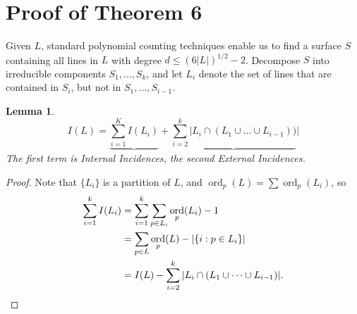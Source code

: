 \documentclass{article}
\theoremstyle{plain}
\newtheorem{lemma}[theorem]{Lemma}
\newtheorem*{example}{Example}
\DeclareMathOperator{\RR}{\mathbf{R}}
\DeclareMathOperator{\ord}{\text{ord}}
\begin{document}


\section{Proof of Theorem 6}

Given $L$, standard polynomial counting techniques enable us to find a surface $S$ containing all lines in $L$ with degree $d \leq (6|L|)^{1/2} - 2$. Decompose $S$ into irreducible components $S_1, \dots, S_k$, and let $L_i$ denote the set of lines that are contained in $S_i$, but not in $S_1, \dots, S_{i-1}$.

\begin{lemma}
    \[ I(L) = \underbrace{\sum_{i = 1}^K I(L_i)} + \underbrace{\sum_{i = 2}^k |L_i \cap (L_1 \cup \dots \cup L_{i-1}))}| \]
    The first term is {\it Internal Incidences}, the second {\it External Incidences}.
\end{lemma}
\begin{proof}
    Note that $\{ L_i \}$ is a partition of $L$, and $\ord_p(L) = \sum \ord_p(L_i)$, so
    \begin{align*}
        \sum_{i = 1}^k I(L_i) &= \sum_{i = 1}^k \sum_{p \in L_i} \ord_p(L_i) - 1\\
        &= \sum_{p \in L} \ord_p(L) - |\{ i: p \in L_i \}|\\
        &= I(L) - \sum_{i = 2}^k |L_i \cap (L_1 \cup \dots \cup L_{i-1})|. \qedhere
    \end{align*}
\end{proof}
\end{document}
